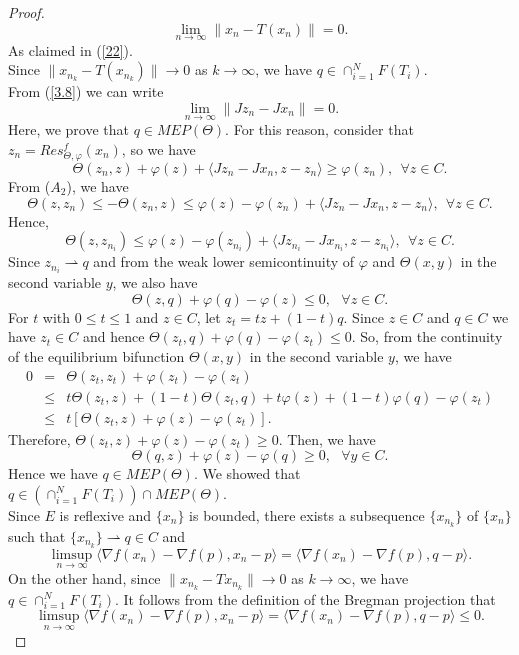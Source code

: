 \documentclass[reqno,b5paper]{amsart}
\theoremstyle{plain}
\theoremstyle{definition}
\numberwithin{equation}{section}
\numberwithin{equation}{section}
\begin{document}
\begin{proof}
$$\lim_{n\to\infty}\|x_{n}-T(x_{n})\|=0.$$ 
As claimed in (\ref{22}).\\
Since $\|x_{n_{k}}-T(x_{n_{k}})\|\to0$ as $k\to\infty$, we have $q\in \cap_{i=1}^{N}F(T_{i})$.\\
From (\ref{3.8}) we can write
$$\lim_{n\to\infty}\|Jz_{n}-Jx_{n}\|=0.$$
Here, we prove that $q\in MEP(\Theta)$. For this reason, consider that $z_{n}=Res_{\Theta,\varphi}^{f}(x_{n})$, so we have
$$\Theta(z_{n},z)+\varphi(z)+\langle Jz_{n}-Jx_{n},z-z_{n}\rangle\geq \varphi(z_{n}), \ \ \forall z\in C.$$
From ($A_{2}$), we have
$$\Theta (z,z_{n})\leq -\Theta (z_{n},z)\leq \varphi(z)-\varphi(z_{n})+\langle Jz_{n}-Jx_{n},z-z_{n}\rangle, \ \ \forall z\in C.$$
Hence, 
$$\Theta(z,z_{n_{i}})\leq \varphi(z)- \varphi(z_{n_{i}})+\langle Jz_{n_{i}}-Jx_{n_{i}},z-z_{n_{i}}\rangle, \ \ \forall z\in C.$$
Since $z_{n_{i}}\rightharpoonup q$ and from the weak lower semicontinuity of $\varphi$ and $\Theta (x,y)$ in the second variable $y$, we also have
$$\Theta (z,q)+\varphi(q)-\varphi(z)\leq0, \ \ \ \forall z\in C.$$
For $t$ with $0\leq t\leq 1$ and $z\in C$, let $z_{t}=tz+(1-t)q$. Since $z\in C$ and $q\in C$ we have $z_{t}\in C$ and hence $\Theta(z_{t},q)+\varphi(q)-\varphi(z_{t})\leq 0$. So, from the continuity of the equilibrium bifunction $\Theta(x,y)$ in the second variable $y$, we have
\begin{eqnarray*}
0&=&\Theta(z_{t},z_{t})+\varphi(z_{t})-\varphi(z_{t})\\
&\leq& t\Theta(z_{t},z)+(1-t)\Theta(z_{t},q)+t\varphi(z)+(1-t)\varphi(q)-\varphi(z_{t})\\
&\leq& t[\Theta(z_{t},z)+\varphi(z)-\varphi(z_{t})].
\end{eqnarray*}
 Therefore, $\Theta(z_{t},z)+\varphi(z)-\varphi(z_{t})\geq0$. Then, we have 
 $$\Theta(q,z)+\varphi(z)-\varphi(q)\geq0, \ \ \ \forall y\in C.$$ 
 Hence we have $q\in MEP(\Theta)$. We showed that $q\in(\cap_{i=1}^{N}F(T_{i}))\cap MEP(\Theta)$.\\
 Since $E$ is reflexive and $\{x_{n}\}$ is bounded, there exists a subsequence $\{x_{n_{k}}\}$ of $\{x_{n}\}$ such that $\{x_{n_{k}}\}\rightharpoonup q\in C$ and
 $$\limsup_{n\to\infty}\langle \nabla f(x_{n})-\nabla f(p),x_{n}-p\rangle=\langle \nabla f(x_{n})-\nabla f(p),q-p\rangle.$$
 On the other hand, since $\|x_{n_{k}}-Tx_{n_{k}}\|\to0$ as $k\to\infty$, we have $q\in \cap_{i=1}^{N}F(T_{i})$. It follows from the definition of the Bregman projection that
 \begin{equation}\label{60}
 \limsup_{n\to\infty}\langle \nabla f(x_{n})-\nabla f(p),x_{n}-p\rangle=\langle \nabla f(x_{n})-\nabla f(p),q-p\rangle\leq 0.

\end{equation}
\end{proof}
\end{document}
